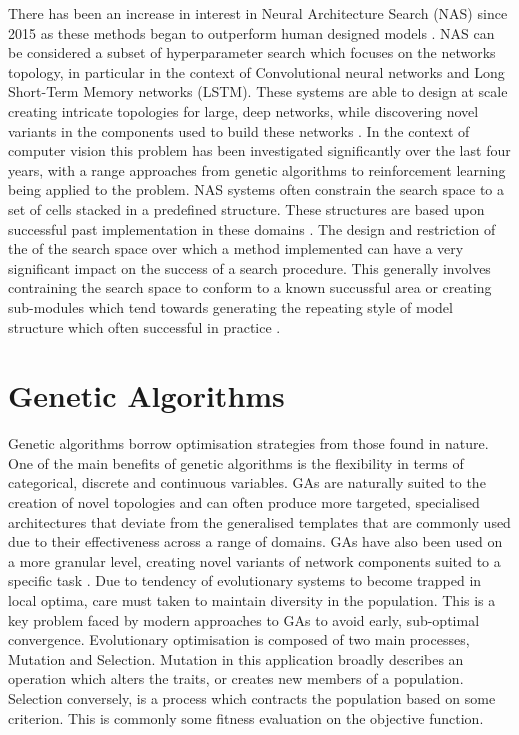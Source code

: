\documentclass{article}
\begin{document}
There has been an increase in interest in Neural Architecture Search (NAS) since 2015 as these methods began to outperform human designed models \cite{51}\cite{41}. 
NAS can be considered a subset of hyperparameter search which focuses on the networks topology, in particular in the context of Convolutional neural networks and Long Short-Term Memory networks (LSTM). 
These systems are able to design at scale creating intricate topologies for large, deep networks, while discovering novel variants in the components used to build these networks \cite{25} \cite{4}.
In the context of computer vision this problem has been investigated significantly over the last four years, with a range approaches from genetic algorithms to reinforcement learning being applied to the problem.
NAS systems often constrain the search space to a set of cells stacked in a predefined structure.
These structures are based upon successful past implementation in these domains \cite{51,resnet,vgg,nasbench101}.
The design and restriction of the of the search space over which a method implemented can have a very significant impact on the success of a search procedure. This generally involves contraining the search space to conform to a known succussful area or creating sub-modules which tend towards generating the repeating style of model structure which often successful in practice  \cite{4} \cite{nasnet}.



		




\section {Genetic Algorithms}

	Genetic algorithms borrow optimisation strategies from those found in nature. One of the main benefits of genetic algorithms is the flexibility in terms of categorical, discrete and continuous variables. GAs are naturally suited to the creation of novel topologies\cite{24} \cite{25} and can often produce more targeted, specialised architectures that deviate from the generalised templates that are commonly used due to their effectiveness across a range of domains. GAs have also been used on a more granular level, creating novel variants of network components suited to a specific task \cite{25}. Due to tendency of evolutionary systems to become trapped in local optima, care must taken to maintain diversity in the population. This is a key problem faced by modern approaches to GAs to avoid early, sub-optimal convergence. Evolutionary optimisation is composed of two main processes, Mutation and Selection. Mutation in this application broadly describes an operation which alters the traits, or creates new members of a population. Selection conversely, is a process which contracts the population based on some criterion. This is commonly some fitness evaluation on the objective function.
\end{document}
